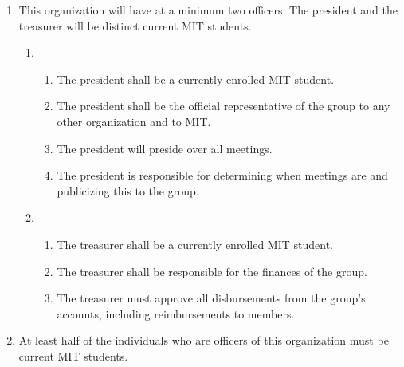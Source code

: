 \documentclass{constitution}
\begin{document}
\begin{enumerate}
    \item This organization will have at a minimum two officers. The president and the treasurer will be distinct current MIT students.
    \begin{enumerate}
        \item {}
        \begin{enumerate}
            \item The president shall be a currently enrolled MIT student.
            
            \item The president shall be the official representative of the group to any other organization and to MIT.
            
            \item The president will preside over all meetings.
            
            \item The president is responsible for determining when meetings are and publicizing this to the group.
        \end{enumerate}

        \item {}
        \begin{enumerate}
            \item The treasurer shall be a currently enrolled MIT student.
            
            \item The treasurer shall be responsible for the finances of the group.
            
            \item The treasurer must approve all disbursements from the group's accounts, including reimbursements to members.
        \end{enumerate}
    \end{enumerate}

    \item At least half of the individuals who are officers of this organization must be current MIT students.
\end{enumerate}
\end{document}
